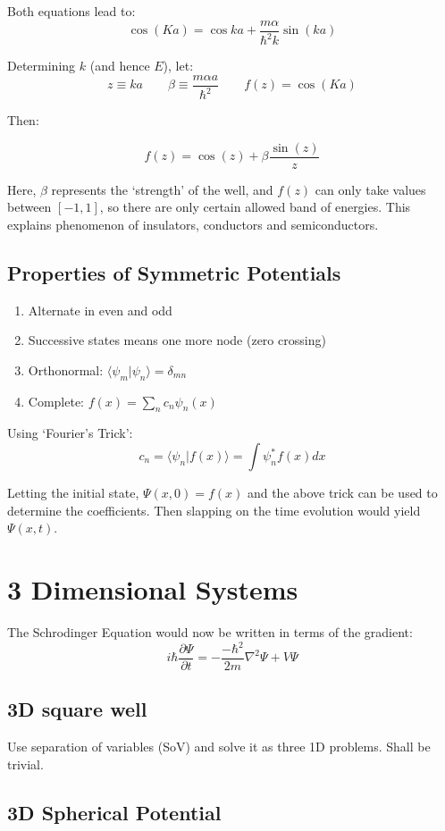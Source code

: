 \documentclass[12pt]{article}
\begin{document}
Both equations lead to:
\[\cos{(Ka)} = \cos{ka} +\frac{m\alpha}{\hbar^2k}\sin{(ka)}\]

Determining $k$ (and hence $E$), let:
\[ z \equiv ka \qquad \beta \equiv \frac{m\alpha a}{\hbar^2}  \qquad f(z) = \cos{(Ka)}\]

Then:

\[f(z) = \cos{(z)} +\beta\frac{\sin{(z)}}{z}\]

Here, $\beta$ represents the `strength' of the well, and $f(z)$ can only take values between $[-1,1]$, so there are only certain allowed band of energies. This explains phenomenon of insulators, conductors and semiconductors.



\subsection{Properties of Symmetric Potentials}
\begin{enumerate}
    \item Alternate in even and odd
    \item Successive states means one more node (zero crossing)
    \item Orthonormal: \(\langle\psi_m|\psi_n\rangle = \delta_{mn}\)
    \item Complete: \( f(x) = \sum_n c_n \psi_n(x)\)
\end{enumerate}
Using `Fourier's Trick':
\[\boxed{c_n = \langle \psi_n | f(x) \rangle  = \int \psi_n^* f(x) dx}\]

Letting the initial state, $\Psi(x,0) = f(x)$ and the above trick can be used to determine the coefficients. Then slapping on the time evolution would yield $\Psi(x,t)$.



\section{3 Dimensional Systems}

The Schrodinger Equation would now be written in terms of the gradient:
\[\boxed{i\hbar\frac{\partial \Psi}{\partial t} = -\frac{-\hbar^2}{2m}\nabla^2 \Psi + V \Psi}\]
\subsection{3D square well}
Use separation of variables (SoV) and solve it as three 1D problems. Shall be trivial.

\subsection{3D Spherical Potential}
\end{document}
